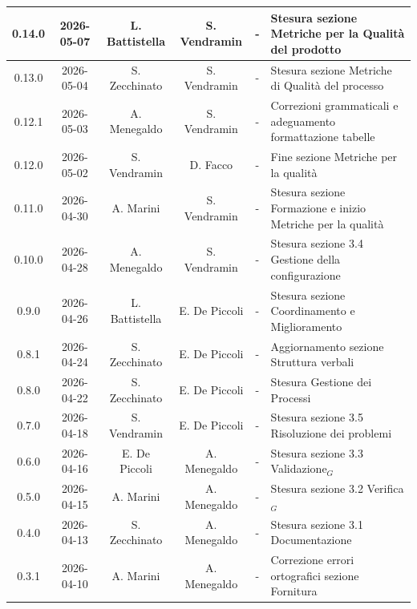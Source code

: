 \documentclass[a4paper, 10pt]{article}
\begin{document}
\begin{longtable}{|c|c|c|c|c|p{3cm}|}
    0.14.0 & 2026-05-07 & L. Battistella & S. Vendramin & - & Stesura sezione Metriche per la Qualità del prodotto \\ \hline

    0.13.0 & 2026-05-04 & S. Zecchinato & S. Vendramin & - & Stesura sezione Metriche di Qualità del processo \\ \hline

    0.12.1 & 2026-05-03 & A. Menegaldo & S. Vendramin & - & Correzioni grammaticali e adeguamento formattazione tabelle \\ \hline

    0.12.0 & 2026-05-02 & S. Vendramin & D. Facco & - & Fine sezione Metriche per la qualità \\ \hline

    0.11.0 & 2026-04-30 & A. Marini & S. Vendramin & - & Stesura sezione Formazione e inizio Metriche per la qualità \\ \hline

    0.10.0 & 2026-04-28 & A. Menegaldo & S. Vendramin & - & Stesura sezione 3.4 Gestione della configurazione \\ \hline

    0.9.0 & 2026-04-26 & L. Battistella & E. De Piccoli & - & Stesura sezione Coordinamento e Miglioramento \\ \hline

    0.8.1 & 2026-04-24 & S. Zecchinato & E. De Piccoli & - & Aggiornamento sezione Struttura verbali \\ \hline

    0.8.0 & 2026-04-22 & S. Zecchinato & E. De Piccoli & - & Stesura Gestione dei Processi \\ \hline

    0.7.0 & 2026-04-18 & S. Vendramin & E. De Piccoli & - & Stesura sezione 3.5 Risoluzione dei problemi \\ \hline

    0.6.0  & 2026-04-16 & E. De Piccoli & A. Menegaldo & - & Stesura sezione 3.3 Validazione$_G$ \\ \hline

    0.5.0  & 2026-04-15 & A. Marini & A. Menegaldo & - & Stesura sezione 3.2 Verifica$_G$ \\ \hline

    0.4.0  & 2026-04-13 & S. Zecchinato & A. Menegaldo & - & Stesura sezione 3.1 Documentazione \\ \hline

    0.3.1  & 2026-04-10 & A. Marini & A. Menegaldo & - & Correzione errori ortografici sezione Fornitura \\ \hline


\end{longtable}
\end{document}
